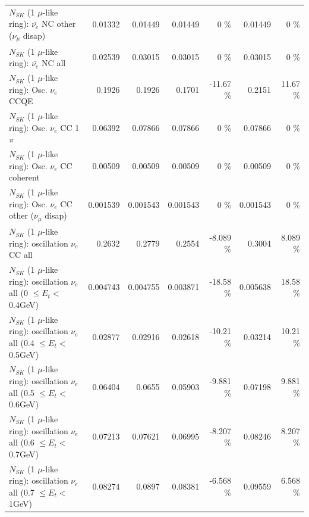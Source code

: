 \begin{table}
\begin{tabular}{| l | r | r | r  r | r  r |}
          $N_{SK}$ (1 $\mu$-like ring): $\bar{\nu_e}$ NC other ($\nu_\mu$ disap) &         0.01332 &         0.01449 &         0.01449 &        0 \%  &         0.01449 &        0 \%  \\ 
                            $N_{SK}$ (1 $\mu$-like ring): $\bar{\nu_{e}}$ NC all &         0.02539 &         0.03015 &         0.03015 &        0 \%  &         0.03015 &        0 \%  \\ 
\hline
\hline
\hline
                                 $N_{SK}$ (1 $\mu$-like ring): Osc. $\nu_e$ CCQE &          0.1926 &          0.1926 &          0.1701 &   -11.67 \%  &          0.2151 &    11.67 \%  \\ 
                            $N_{SK}$ (1 $\mu$-like ring): Osc. $\nu_e$ CC 1$\pi$ &         0.06392 &         0.07866 &         0.07866 &        0 \%  &         0.07866 &        0 \%  \\ 
                          $N_{SK}$ (1 $\mu$-like ring): Osc. $\nu_e$ CC coherent &         0.00509 &         0.00509 &         0.00509 &        0 \%  &         0.00509 &        0 \%  \\ 
           $N_{SK}$ (1 $\mu$-like ring): Osc. $\nu_e$ CC other ($\nu_\mu$ disap) &        0.001539 &        0.001543 &        0.001543 &        0 \%  &        0.001543 &        0 \%  \\ 
                        $N_{SK}$ (1 $\mu$-like ring): oscillation $\nu_e$ CC all &          0.2632 &          0.2779 &          0.2554 &   -8.089 \%  &          0.3004 &    8.089 \%  \\ 
\hline
$N_{SK}$ (1 $\mu$-like ring): oscillation $\nu_{e}$ all (0 $\leq E_{t} <$ 0.4GeV) &        0.004743 &        0.004755 &        0.003871 &   -18.58 \%  &        0.005638 &    18.58 \%  \\ 
$N_{SK}$ (1 $\mu$-like ring): oscillation $\nu_{e}$ all (0.4 $\leq E_{t} <$ 0.5GeV) &         0.02877 &         0.02916 &         0.02618 &   -10.21 \%  &         0.03214 &    10.21 \%  \\ 
$N_{SK}$ (1 $\mu$-like ring): oscillation $\nu_{e}$ all (0.5 $\leq E_{t} <$ 0.6GeV) &         0.06404 &          0.0655 &         0.05903 &   -9.881 \%  &         0.07198 &    9.881 \%  \\ 
$N_{SK}$ (1 $\mu$-like ring): oscillation $\nu_{e}$ all (0.6 $\leq E_{t} <$ 0.7GeV) &         0.07213 &         0.07621 &         0.06995 &   -8.207 \%  &         0.08246 &    8.207 \%  \\ 
$N_{SK}$ (1 $\mu$-like ring): oscillation $\nu_{e}$ all (0.7 $\leq E_{t} <$ 1GeV) &         0.08274 &          0.0897 &         0.08381 &   -6.568 \%  &         0.09559 &    6.568 \%  \\ 

\end{tabular}
\end{table}
